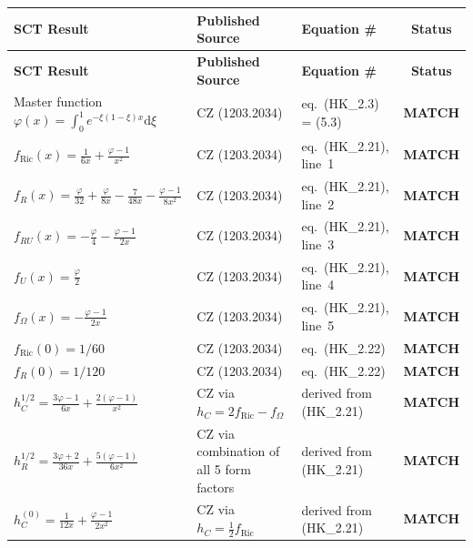 \documentclass[12pt,a4paper]{article}
\theoremstyle{definition}
\theoremstyle{remark}
\newcommand{\dd}{\mathrm{d}}
\newcommand{\match}{\textcolor{green!60!black}{\textbf{MATCH}}}
\begin{document}
\begin{center}
\renewcommand{\arraystretch}{1.3}
\begin{longtable}{p{3.5cm} p{4.5cm} p{3.5cm} c}
\toprule
\textbf{SCT Result} & \textbf{Published Source} & \textbf{Equation \#} & \textbf{Status} \\
\midrule
\endfirsthead
\toprule
\textbf{SCT Result} & \textbf{Published Source} & \textbf{Equation \#} & \textbf{Status} \\
\midrule
\endhead
Master function $\varphi(x) = \int_0^1 e^{-\xi(1-\xi)x}\dd\xi$
& CZ (1203.2034) & eq.~(HK\_2.3) = (5.3) & \match \\[4pt]

$f_{\text{Ric}}(x) = \frac{1}{6x} + \frac{\varphi-1}{x^2}$
& CZ (1203.2034) & eq.~(HK\_2.21), line~1 & \match \\[4pt]

$f_R(x) = \frac{\varphi}{32} + \frac{\varphi}{8x} - \frac{7}{48x} - \frac{\varphi-1}{8x^2}$
& CZ (1203.2034) & eq.~(HK\_2.21), line~2 & \match \\[4pt]

$f_{RU}(x) = -\frac{\varphi}{4} - \frac{\varphi-1}{2x}$
& CZ (1203.2034) & eq.~(HK\_2.21), line~3 & \match \\[4pt]

$f_U(x) = \frac{\varphi}{2}$
& CZ (1203.2034) & eq.~(HK\_2.21), line~4 & \match \\[4pt]

$f_\Omega(x) = -\frac{\varphi-1}{2x}$
& CZ (1203.2034) & eq.~(HK\_2.21), line~5 & \match \\[4pt]

$f_{\text{Ric}}(0) = 1/60$
& CZ (1203.2034) & eq.~(HK\_2.22) & \match \\[4pt]

$f_R(0) = 1/120$
& CZ (1203.2034) & eq.~(HK\_2.22) & \match \\[4pt]

$h_C^{1/2} = \frac{3\varphi-1}{6x} + \frac{2(\varphi-1)}{x^2}$
& CZ via $h_C = 2f_{\text{Ric}} - f_\Omega$
& derived from (HK\_2.21) & \match \\[4pt]

$h_R^{1/2} = \frac{3\varphi+2}{36x} + \frac{5(\varphi-1)}{6x^2}$
& CZ via combination of all 5 form factors
& derived from (HK\_2.21) & \match \\[4pt]

$h_C^{(0)} = \frac{1}{12x} + \frac{\varphi-1}{2x^2}$
& CZ via $h_C = \frac{1}{2}f_{\text{Ric}}$
& derived from (HK\_2.21) & \match \\[4pt]


\end{longtable}
\end{center}
\end{document}
